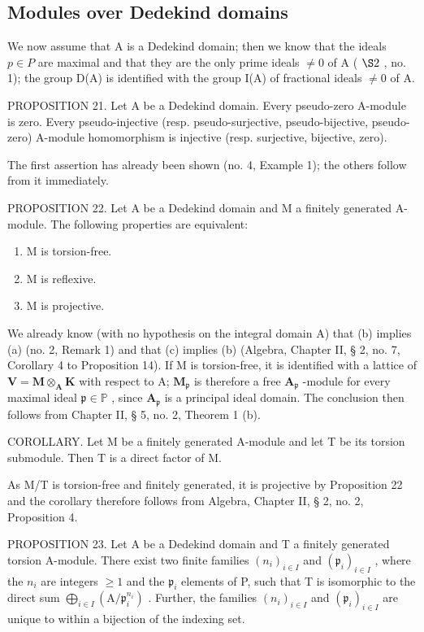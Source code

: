 \subsection{Modules over Dedekind domains}

We now assume that A is a Dedekind domain; then we know that the ideals \(p \in P\) are maximal and that they are the only prime ideals \(\neq 0\) of A ( \(\S 2\) , no. 1); the group D(A) is identified with the group I(A) of fractional ideals \(\neq 0\) of A.

PROPOSITION 21. Let A be a Dedekind domain. Every pseudo-zero A-module is zero. Every pseudo-injective (resp. pseudo-surjective, pseudo-bijective, pseudo-zero) A-module homomorphism is injective (resp. surjective, bijective, zero).

The first assertion has already been shown (no. 4, Example 1); the others follow from it immediately.

PROPOSITION 22. Let A be a Dedekind domain and M a finitely generated A-module. The following properties are equivalent:

\begin{enumerate}
\def\labelenumi{(\alph{enumi})}
\item
  M is torsion-free.
\item
  M is reflexive.
\item
  M is projective.
\end{enumerate}

We already know (with no hypothesis on the integral domain A) that (b) implies (a) (no. 2, Remark 1) and that (c) implies (b) (Algebra, Chapter II, § 2, no. 7, Corollary 4 to Proposition 14). If M is torsion-free, it is identified with a lattice of \(\mathbf{V} = \mathbf{M} \otimes_{\mathbf{A}} \mathbf{K}\) with respect to A; \(\mathbf{M}_{\mathfrak{p}}\) is therefore a free \(\mathbf{A}_{\mathfrak{p}}\) -module for every maximal ideal \(\mathfrak{p} \in \mathbb{P}\) , since \(\mathbf{A}_{\mathfrak{p}}\) is a principal ideal domain. The conclusion then follows from Chapter II, § 5, no. 2, Theorem 1 (b).

COROLLARY. Let M be a finitely generated A-module and let T be its torsion submodule. Then T is a direct factor of M.

As M/T is torsion-free and finitely generated, it is projective by Proposition 22 and the corollary therefore follows from Algebra, Chapter II, § 2, no. 2, Proposition 4.

PROPOSITION 23. Let A be a Dedekind domain and T a finitely generated torsion A-module. There exist two finite families \((n_{i})_{i\in I}\) and \((\mathfrak{p}_i)_{i\in I}\) , where the \(n_i\) are integers \(\geqslant 1\) and the \(\mathfrak{p}_i\) elements of P, such that T is isomorphic to the direct sum \(\bigoplus_{i\in I} (\mathrm{A} / \mathfrak{p}_{i}^{n_i})\) . Further, the families \((n_{i})_{i\in I}\) and \((\mathfrak{p}_i)_{i\in I}\) are unique to within a bijection of the indexing set.

